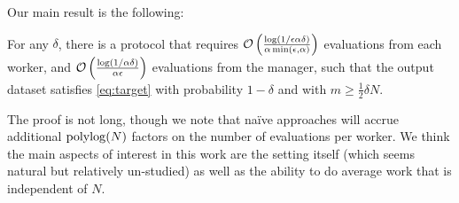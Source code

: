\documentclass[anon,12pt]{colt2016} %
\newcommand{\goodfrac}{\alpha}
\newcommand{\quality}{\epsilon}
\newcommand{\failprob}{\delta}
\begin{document}
Our main result is the following:
\begin{theorem}
\label{thm:main}
For any $\failprob$, there is a protocol that requires 
$\oo\p{\frac{\log(1/\quality\goodfrac\failprob)}{\goodfrac\min\p{\quality,\goodfrac}}}$ evaluations from each worker, and $\oo\p{\frac{\log(1/\goodfrac\failprob)}{\goodfrac\quality}}$ evaluations from the manager, such that the output dataset 
satisfies \eqref{eq:target} with probability $1-\failprob$ and with $m \geq \frac{1}{2}\delta N$.
\end{theorem}
The proof is not long, though we note that na\"ive approaches will 
accrue additional $\operatorname{polylog}(N)$ factors on the number of evaluations per worker.
We think the main aspects of interest in this work are the setting itself 
(which seems natural but relatively un-studied) as well as the ability to do 
average work that is independent of $N$.
\end{document}

